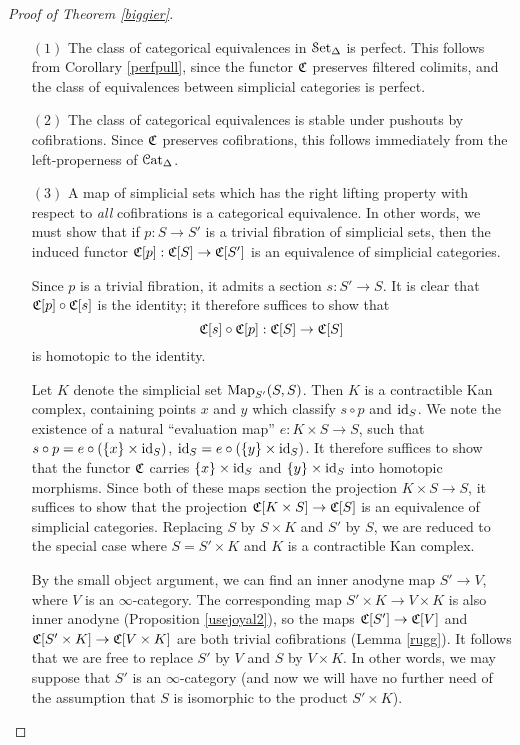 \begin{proof}[Proof of Theorem \ref{biggier}]
\begin{itemize}
\item[$(1)$] The class of categorical equivalences in $\operatorname{\mathcal{S}et_{\Delta}}$ is perfect. This follows from Corollary \ref{perfpull}, since the functor $\operatorname{\mathfrak{C}}$ preserves filtered colimits, and the class of equivalences between simplicial categories is perfect. 
\item[$(2)$] The class of categorical equivalences is stable under pushouts by cofibrations.
Since $\operatorname{\mathfrak{C}}$ preserves cofibrations, this follows immediately from the left-properness of $\operatorname{\mathcal{C}at_{\Delta}}$.
\item[$(3)$] A map of simplicial sets which has the right lifting property with respect to {\em all} cofibrations is a categorical equivalence. In other words, we must show that if $p: S \rightarrow S'$ is a trivial fibration of simplicial sets, then
the induced functor $\operatorname{\mathfrak{C}}[p]: \operatorname{\mathfrak{C}}[S] \rightarrow
\operatorname{\mathfrak{C}}[S']$ is an equivalence of simplicial categories.

Since $p$ is a trivial fibration, it admits a section $s: S'
\rightarrow S$. It is clear that $\operatorname{\mathfrak{C}}[p] \circ \operatorname{\mathfrak{C}}[s]$
is the identity; it therefore suffices to show that $$\operatorname{\mathfrak{C}}[s]
\circ \operatorname{\mathfrak{C}}[p]: \operatorname{\mathfrak{C}}[S] \rightarrow \operatorname{\mathfrak{C}}[S]$$ is
homotopic to the identity.

Let $K$ denote the simplicial set $\operatorname{{Map}}_{S'}(S,S)$. Then $K$ is a
contractible Kan complex, containing points $x$ and $y$ which
classify $s \circ p$ and $\operatorname{id}_S$. We note the existence of a
natural ``evaluation map'' $e: K \times S \rightarrow S$, such
that $s \circ p = e \circ (\{x\} \times \operatorname{id}_S)$, $\operatorname{id}_S = e \circ
( \{y\} \times \operatorname{id}_S )$. It therefore suffices to show that the
functor $\operatorname{\mathfrak{C}}$ carries $\{x\} \times \operatorname{id}_{S}$ and $\{y\}
\times \operatorname{id}_{S}$ into homotopic morphisms. Since both of these maps
section the projection $K \times S \rightarrow S$, it suffices to
show that the projection $\operatorname{\mathfrak{C}}[K \times S] \rightarrow
\operatorname{\mathfrak{C}}[S]$ is an equivalence of simplicial categories. Replacing $S$ by $S \times K$
and $S'$ by $S$, we are reduced to the
special case where $S = S' \times K$ and $K$ is a contractible
Kan complex.

By the small object argument, we can find an inner anodyne map $S' \rightarrow V$, where $V$ is an $\infty$-category. The corresponding map $S' \times K \rightarrow V
\times K$ is also inner anodyne (Proposition \ref{usejoyal2}), so the maps
$\operatorname{\mathfrak{C}}[S'] \rightarrow \operatorname{\mathfrak{C}}[V]$ and $\operatorname{\mathfrak{C}}[S' \times
K] \rightarrow \operatorname{\mathfrak{C}}[V \times K]$ are both trivial
cofibrations (Lemma \ref{rugg}). It follows that we are free to replace $S'$ by $V$
and $S$ by $V \times K$. In other words, we may suppose that $S'$
is an $\infty$-category (and now we will have no further need of the
assumption that $S$ is isomorphic to the product $S' \times K$).


\end{itemize}
\end{proof}
